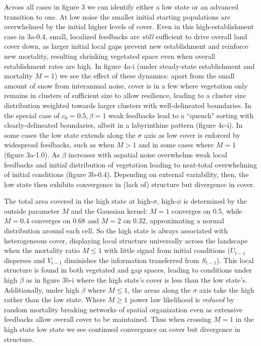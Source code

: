 \documentclass[10pt]{article}
\begin{document}
\begin{linenumbers}
Across all cases in figure 3 we can identify either a low state or an advanced transition to one. At low noise the smaller initial starting populations are overwhelmed by the initial higher levels of cover. Even in this high-establishment case in 3a-0.4, small, localized feedbacks are \textit{still} sufficient to drive overall land cover down, as larger initial local gaps prevent new establishment and reinforce new mortality, resulting shrinking vegetated space even when overall establishment rates are high.  In figure 4a-i (under steady-state establishment and mortality $M = 1$) we see the effect of these dynamics: apart from the small amount of snow from interannual noise, cover is in a few where vegetation only remains in clusters of sufficient size to allow resilience, leading to a cluster size distribution weighted towards larger clusters with well-delineated boundaries. In the special case of $c_0 = 0.5, \beta = 1$  weak feedbacks lead to a ``quench" sorting with clearly-delineated boundaries, albeit in a labyrinthine pattern (figure 4c-i). In some cases the low state extends along the $\sigma$ axis as low cover is enforced by widespread feedbacks, such as when $M > 1$ and in some cases where $M = 1$ (figure 3a-1.0). As $\beta$ increases with aspatial noise overwhelms weak local feedbacks and initial distribution of vegetation leading to neat-total overwhelming of initial conditions (figure 3b-0.4). Depending on external variability, then, the low state then exhibits convergence in (lack of) structure but divergence in cover. 

The total area covered in the high state at high-$\sigma$, high-$\phi$ is determined by the outside parameter $M$ and the Gaussian kernel: $M = 1$ converges on 0.5, while $M = 0.4$ converges on 0.68 and $M = 2$ on 0.32, approximating a normal distribution around each cell. So the high state is always associated with heterogeneous cover, displaying local structure universally across the landscape when the mortality ratio $M \le 1$ with little signal from initial conditions ($U_{t-1}$ disperses and $V_{t-1}$ diminishes the information transferred from $S_{t-1}$). This local structure is found in both vegetated and gap spaces, leading to conditions under high $\beta$ as in figure 3b-i where the high state's cover is less than the low state's. Additionally, under high $\beta$ where $M ≤ 1$, the areas along the $\sigma$ axis take the high rather than the low state. Where $M \ge 1$ power law likelihood is \textit{reduced} by random mortality breaking networks of spatial organization even as extensive feedbacks allow overall cover to be maintained. Thus when crossing $M = 1$ in the high state low state we see continued convergence on cover but divergence in structure.


\end{linenumbers}
\end{document}

